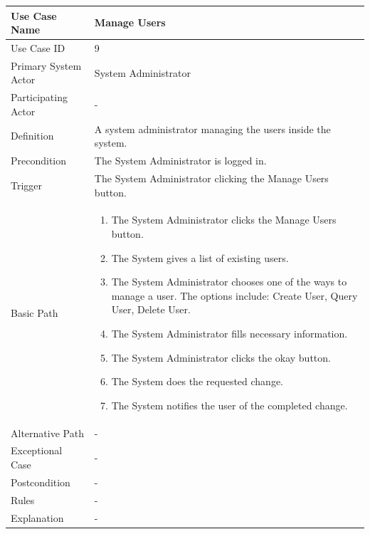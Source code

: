 \documentclass[a4paper,12pt]{report}
\begin{document}
		\begin{tabular}{|m{4cm}|m{11.5cm}|}
			\hline
				Use Case Name & Manage Users\\
			\hline
				Use Case ID & 9\\
			\hline
				Primary System Actor & System Administrator\\
			\hline
				Participating Actor & -\\
			\hline
				Definition & A system administrator managing the users inside the system.\\
			\hline
				Precondition & The System Administrator is logged in.\\
			\hline
				Trigger & The System Administrator clicking the Manage Users button.\\
			\hline
				Basic Path & \begin{enumerate}
					\item The System Administrator clicks the Manage Users button.
					\item The System gives a list of existing users.
					\item The System Administrator chooses one of the ways to manage a user. The options include: Create User, Query User, Delete User.
					\item The System Administrator fills necessary information.
					\item The System Administrator clicks the okay button.
					\item The System does the requested change.
					\item The System notifies the user of the completed change.
				\end{enumerate}		
				\\
			\hline
				Alternative Path & -\\
			\hline
				Exceptional Case & -\\
			\hline
				Postcondition & -\\
			\hline
				Rules & -\\
			\hline
				Explanation & -\\
			\hline
		\end{tabular}
\end{document}
